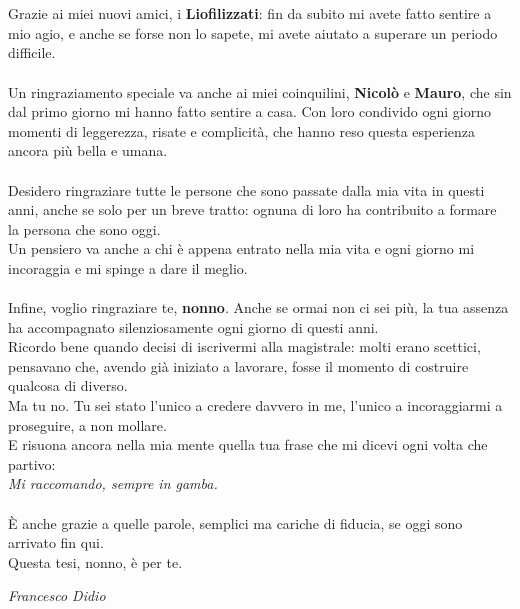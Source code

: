 \\\\
Grazie ai miei nuovi amici, i \textbf{Liofilizzati}: fin da subito mi avete fatto sentire a mio agio, e anche se forse non lo sapete, mi avete aiutato a superare un periodo difficile.
\\\\
Un ringraziamento speciale va anche ai miei coinquilini, \textbf{Nicolò} e \textbf{Mauro}, che sin dal primo giorno mi hanno fatto sentire a casa. Con loro condivido ogni giorno momenti di leggerezza, risate e complicità, che hanno reso questa esperienza ancora più bella e umana.
\\\\
Desidero ringraziare tutte le persone che sono passate dalla mia vita in questi anni, anche se solo per un breve tratto: ognuna di loro ha contribuito a formare la persona che sono oggi.
\\
Un pensiero va anche a chi è appena entrato nella mia vita e ogni giorno mi incoraggia e mi spinge a dare il meglio.
\\\\
Infine, voglio ringraziare te, \textbf{nonno}. Anche se ormai non ci sei più, la tua assenza ha accompagnato silenziosamente ogni giorno di questi anni.\\
Ricordo bene quando decisi di iscrivermi alla magistrale: molti erano scettici, pensavano che, avendo già iniziato a lavorare, fosse il momento di costruire qualcosa di diverso.\\
Ma tu no. Tu sei stato l'unico a credere davvero in me, l'unico a incoraggiarmi a proseguire, a non mollare.\\
E risuona ancora nella mia mente quella tua frase che mi dicevi ogni volta che partivo:\\
\textit{Mi raccomando, sempre in gamba.}
\\\\
È anche grazie a quelle parole, semplici ma cariche di fiducia, se oggi sono arrivato fin qui.
\\
Questa tesi, nonno, è per te.
\vspace*{\fill}
\begin{flushright}
\textit{Francesco Didio}
\end{flushright}